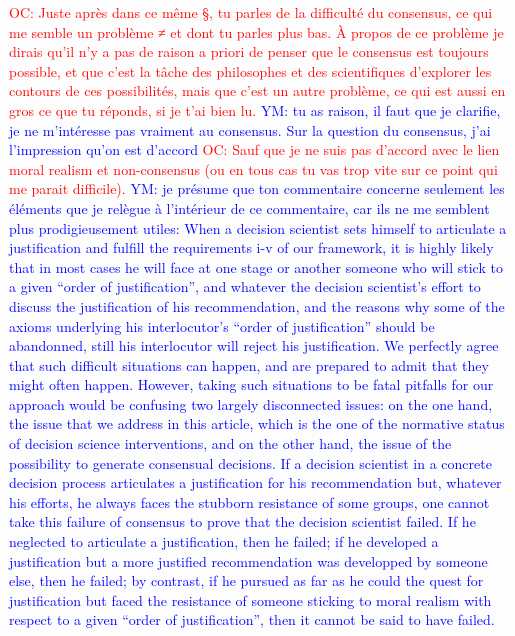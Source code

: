 \documentclass[preprint, french, english, 11pt, authoryear]{elsarticle}%
\newcommand{\commentYM}[1]{\textcolor{blue}{YM: #1}}
\newcommand{\commentOC}[1]{\textcolor{red}{OC: #1}}
\begin{document}
\commentOC{Juste après dans ce même §, tu parles de la difficulté du consensus, ce qui me semble un problème ≠ et dont tu parles plus bas. À propos de ce problème je dirais qu’il n’y a pas de raison a priori de penser que le consensus est toujours possible, et que c’est la tâche des philosophes et des scientifiques d’explorer les contours de ces possibilités, mais que c’est un autre problème, ce qui est aussi en gros ce que tu réponds, si je t’ai bien lu.}
\commentYM{tu as raison, il faut que je clarifie, je ne m'intéresse pas vraiment au consensus. Sur la question du consensus, j'ai l'impression qu'on est d'accord}
\commentOC{Sauf que je ne suis pas d’accord avec le lien moral realism et non-consensus (ou en tous cas tu vas trop vite sur ce point qui me parait difficile).}
\commentYM{je présume que ton commentaire concerne seulement les éléments que je relègue à l'intérieur de ce commentaire, car ils ne me semblent plus prodigieusement utiles: When a decision scientist sets himself to articulate a justification and fulfill the requirements i-v of our framework, it is highly likely that in most cases he will face at one stage or another someone who will stick to a given ``order of justification'', and whatever the decision scientist's effort to discuss the justification of his recommendation, and the reasons why some of the axioms underlying his interlocutor's ``order of justification'' should be abandonned, still his interlocutor will reject his justification. We perfectly agree that such difficult situations can happen, and are prepared to admit that they might often happen. However, taking such situations to be fatal pitfalls for our approach would be confusing two largely disconnected issues: on the one hand, the issue that we address in this article, which is the one of the normative status of decision science interventions, and on the other hand, the issue of the possibility to generate consensual decisions. If a decision scientist in a concrete decision process articulates a justification for his recommendation but, whatever his efforts, he always faces the stubborn resistance of some groups, one cannot take this failure of consensus to prove that the decision scientist failed. If he neglected to articulate a justification, then he failed; if he developed a justification but a more justified recommendation was developped by someone else, then he failed; by contrast, if he pursued as far as he could the quest for justification but faced the resistance of someone sticking to moral realism with respect to a given ``order of justification'', then it cannot be said to have failed.}
\end{document}
